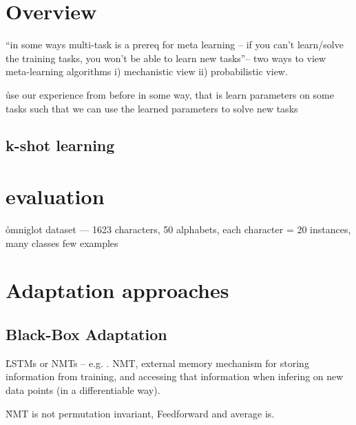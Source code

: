 \section{Overview}



\r{``in some ways multi-task is a prereq for meta learning -- if you can't learn/solve the training tasks, you won't be able to learn new tasks''-- two ways to view meta-learning algorithms i) mechanistic view ii) probabilistic view.}

\r{use our experience from before in some way, that is learn parameters on some tasks such that we can use the learned parameters to solve new tasks}



\subsection{k-shot learning}



\section{evaluation}

\r{omniglot dataset --- 1623 characters, 50 alphabets, each character = 20 instances, many classes few examples}


\section{Adaptation approaches}

\subsection{Black-Box Adaptation}

\r{LSTMs or NMTs -- e.g. \cite{santoro2016meta}. NMT, external memory mechanism for storing information from training, and accessing that information when infering on new data points (in a differentiable way).}

\r{NMT is not permutation invariant, Feedforward and average is.\cite{garnelo2018conditional}}

